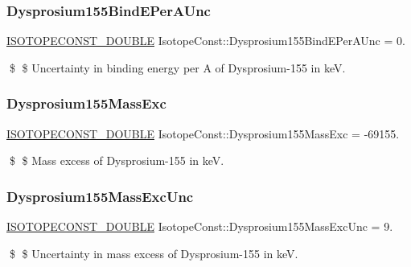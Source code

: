 \subsubsection{\texorpdfstring{Dysprosium155\+Bind\+E\+Per\+A\+Unc}{Dysprosium155BindEPerAUnc}}
{\footnotesize\ttfamily \mbox{\hyperlink{group___isotope_const-_macros_ga8f45a7272ce02c0b4c65c44636ed719a}{I\+S\+O\+T\+O\+P\+E\+C\+O\+N\+S\+T\+\_\+\+D\+O\+U\+B\+LE}} Isotope\+Const\+::\+Dysprosium155\+Bind\+E\+Per\+A\+Unc = 0.}

\$ \$ Uncertainty in binding energy per A of Dysprosium-\/155 in keV. \mbox{\label{group___isotope_const-_dysprosium-_dy155_ga9cf8f2b97e52648fd3d3efd7ad7b7e0b}} 
\subsubsection{\texorpdfstring{Dysprosium155\+Mass\+Exc}{Dysprosium155MassExc}}
{\footnotesize\ttfamily \mbox{\hyperlink{group___isotope_const-_macros_ga8f45a7272ce02c0b4c65c44636ed719a}{I\+S\+O\+T\+O\+P\+E\+C\+O\+N\+S\+T\+\_\+\+D\+O\+U\+B\+LE}} Isotope\+Const\+::\+Dysprosium155\+Mass\+Exc = -\/69155.}

\$ \$ Mass excess of Dysprosium-\/155 in keV. \mbox{\label{group___isotope_const-_dysprosium-_dy155_ga99d988ddadeb2dcf9d339e2ff118b739}} 
\subsubsection{\texorpdfstring{Dysprosium155\+Mass\+Exc\+Unc}{Dysprosium155MassExcUnc}}
{\footnotesize\ttfamily \mbox{\hyperlink{group___isotope_const-_macros_ga8f45a7272ce02c0b4c65c44636ed719a}{I\+S\+O\+T\+O\+P\+E\+C\+O\+N\+S\+T\+\_\+\+D\+O\+U\+B\+LE}} Isotope\+Const\+::\+Dysprosium155\+Mass\+Exc\+Unc = 9.}

\$ \$ Uncertainty in mass excess of Dysprosium-\/155 in keV. \mbox{\label{group___isotope_const-_dysprosium-_dy155_gad447e4f3df776710b172458d3392a777}} 

